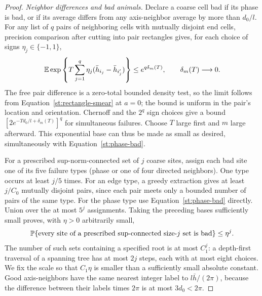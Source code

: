 \begin{proof}
\emph{Neighbor differences and bad animals.}
Declare a coarse cell bad if its phase is bad, or if its average differs
from any axis-neighbor average by more than $d_0/l$.
For any list of $q$ pairs of neighboring cells with mutually disjoint
end cells, precision comparison after cutting into pair rectangles gives,
for each choice of signs $\eta_j\in\{-1,1\}$,
\[
 \mathbb E\exp\left\{T\sum_{j=1}^q\eta_j
                   (\bar h_{i_j}-\bar h_{i'_j})\right\}
 \le e^{q\delta_m(T)},\qquad \delta_m(T)\longrightarrow0.
\]
The free pair difference is a zero-total bounded density test, so the
limit follows from Equation~\eqref{st:rectangle-smear} at $a=0$; the bound
is uniform in the pair's location and orientation. Chernoff and the
$2^q$ sign choices give a bound
$[2e^{-Td_0/l+\delta_m(T)}]^q$ for simultaneous failures. Choose $T$ large
first and $m$ large afterward. This exponential base can thus be made as
small as desired, simultaneously with Equation~\eqref{st:phase-bad}.

For a prescribed sup-norm-connected set of $j$ coarse sites, assign each
bad site one of its five failure types (phase or one of four directed
neighbors). One type occurs at least $j/5$ times. For an edge type, a
greedy extraction gives at least $j/C_0$ mutually disjoint pairs, since
each pair meets only a bounded number of pairs of the same type. For the
phase type use Equation~\eqref{st:phase-bad} directly. Union over the at
most $5^j$ assignments. Taking the preceding bases sufficiently small
proves, with $\eta>0$ arbitrarily small,
\begin{equation}\label{st:animal}
 \mathbb P\{\text{every site of a prescribed sup-connected size-$j$ set is bad}\}
 \le\eta^j.
\end{equation}
The number of such sets containing a specified root is at most $C_1^j$:
a depth-first traversal of a spanning tree has at most $2j$ steps, each
with at most eight choices. We fix the scale so that $C_1\eta$ is smaller
than a sufficiently small absolute constant. Good axis-neighbors have
the same nearest integer label to $l\bar h/(2\pi)$, because the difference
between their labels times $2\pi$ is at most $3d_0<2\pi$.


\end{proof}
